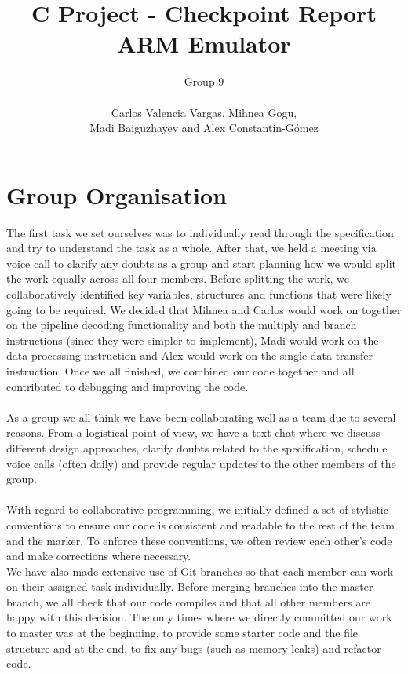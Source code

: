 \documentclass[11pt]{article}
\begin{document}
\title{%
  C Project - Checkpoint Report \\
  \large ARM Emulator}
\author{Group 9\\\\Carlos Valencia Vargas, Mihnea Gogu,\\Madi Baiguzhayev and Alex Constantin-G\'omez}

\maketitle

\section{Group Organisation}
The first task we set ourselves was to individually read through the specification and try to understand the task as a whole.  After that, we held a meeting via voice call to clarify any doubts as a group and start planning how we would split the work equally across all four members. Before splitting the work, we collaboratively identified key variables, structures and functions that were likely going to be required. We decided that Mihnea and Carlos would work on together on the pipeline decoding functionality and both the multiply and branch instructions (since they were simpler to implement), Madi would work on the data processing instruction and Alex would work on the single data transfer instruction. Once we all finished, we combined our code together and all contributed to debugging and improving the code.\\\\
As a group we all think we have been collaborating well as a team due to several reasons. From a logistical point of view, we have a text chat where we discuss different design approaches, clarify doubts related to the specification, schedule voice calls (often daily) and provide regular updates to the other members of the group.\\\\
With regard to collaborative programming, we initially defined a set of stylistic conventions to ensure our code is consistent and readable to the rest of the team and the marker. To enforce these conventions, we often review each other’s code and make corrections where necessary.\\
We have also made extensive use of Git branches so that each member can work on their assigned task individually. Before merging branches into the master branch, we all check that our code compiles and that all other members are happy with this decision. The only times where we directly committed our work to master was at the beginning, to provide some starter code and the file structure and at the end, to fix any bugs (such as memory leaks) and refactor code.\\
\end{document}
